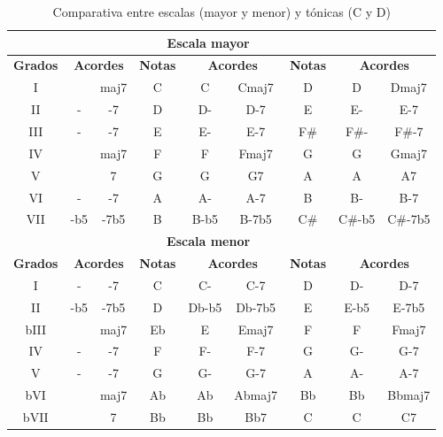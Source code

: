 \begin{table}[h]
    \centering
    \begin{tabular}{c|c|c||c|c|c||c|c|c}
        \multicolumn{3}{c}{} & \multicolumn{3}{c}{\textbf{Escala mayor}}  \\
        \hline  
        \multicolumn{1}{c|}{\textbf{Grados}} & \multicolumn{2}{c||}{\textbf{Acordes}} & \multicolumn{1}{c|}{\textbf{Notas}} & \multicolumn{2}{c||}{\textbf{Acordes}} & \multicolumn{1}{c|}{\textbf{Notas}} & \multicolumn{2}{c}{\textbf{Acordes}} \\
           \hline
    I &     & maj7 & C & C    & Cmaj7 & D   & D      & Dmaj7   \\
        II & -   & -7   &    D  & D-   & D-7   &    E    & E-     & E-7     \\
        III & -   & -7   &    E  & E-   & E-7   &    F\#  & F\#-   & F\#-7   \\
        IV &     & maj7 &    F  & F    & Fmaj7 &    G    & G      & Gmaj7   \\
        V &     & 7    &    G  & G    & G7    &    A    & A      & A7      \\
        VI & -   & -7   &    A  & A-   & A-7   &    B    & B-     & B-7     \\
        VII & -b5 & -7b5 &    B  & B-b5 & B-7b5 &    C\#  & C\#-b5 & C\#-7b5 \\
        \hline
        \multicolumn{3}{c}{} & \multicolumn{3}{c}{\textbf{Escala menor}}  \\
        \hline  
        \multicolumn{1}{c|}{\textbf{Grados}} & \multicolumn{2}{c||}{\textbf{Acordes}} & \multicolumn{1}{c|}{\textbf{Notas}} & \multicolumn{2}{c||}{\textbf{Acordes}} & \multicolumn{1}{c|}{\textbf{Notas}} & \multicolumn{2}{c}{\textbf{Acordes}} \\
           \hline 
    I  & -   & -7   & C  & C-    & C-7    & D & D-   & D-7    \\
        II  & -b5 & -7b5 &    D   & Db-b5 & Db-7b5 &    E  & E-b5 & E-7b5  \\
        bIII &     & maj7 &    Eb  & E     & Emaj7  &    F  & F    & Fmaj7  \\
        IV  & -   & -7   &    F   & F-    & F-7    &    G  & G-   & G-7    \\
        V  & -   & -7   &    G   & G-    & G-7    &    A  & A-   & A-7    \\
        bVI &     & maj7 &    Ab  & Ab    & Abmaj7 &    Bb & Bb   & Bbmaj7 \\
        bVII &     & 7    &    Bb  & Bb    & Bb7    &    C  & C    & C7     \\

    \end{tabular}
    \caption{Comparativa entre escalas (mayor y menor) y tónicas (C y D)}
    \label{tab:comparativa_scalas}
\end{table}

